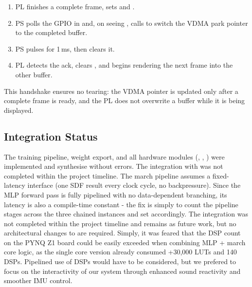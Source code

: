 \begin{enumerate}
    \item PL finishes a complete frame, sets  and
    .
    \item PS polls the GPIO in  and, on seeing
    , calls  to
    switch the VDMA park pointer to the completed buffer.
    \item PS pulses  for 1\,ms, then clears it.
    \item PL detects the ack, clears , and begins
    rendering the next frame into the other buffer.
\end{enumerate}

This handshake ensures no tearing: the VDMA pointer is updated only after a
complete frame is ready, and the PL does not overwrite a buffer while it is
being displayed.


\subsection{Integration Status}

The training pipeline, weight export, and all hardware modules
(, , )
were implemented and synthesise without errors. The integration with
 was not completed within the project timeline. The march
pipeline assumes a fixed-latency interface (one SDF result every clock cycle,
no backpressure). Since the MLP forward pass is fully pipelined with no
data-dependent branching, its latency is also a compile-time constant -
the fix is simply to count the pipeline stages across the three chained
 instances and set  accordingly.
The integration was not completed within the project timeline and remains
as future work, but no architectural changes to  are
required. Simply, it was feared that the DSP count on the PYNQ Z1 board could be easily exceeded when combining MLP + march core logic, as the single core version already consumed +30,000 LUTs and 140 DSPs. Pipelined use of DSPs would have to be considered, but we prefered to focus on the interactivity of our system through enhanced sound reactivity and smoother IMU control.
